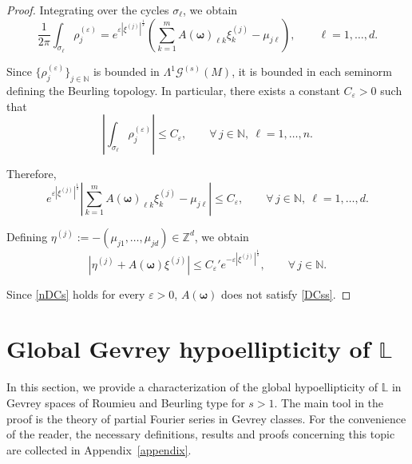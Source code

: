 \documentclass[11pt,reqno]{amsart}
\numberwithin{equation}{section}
\begin{document}
\begin{proof}
	Integrating over the cycles $\sigma_\ell$,
	we obtain
	\[
	\frac{1}{2\pi} \int_{\sigma_\ell} \rho_j^{(\varepsilon)} =  	e^{\varepsilon |\xi^{(j)}|^{\frac{1}{s}}}\left( \sum_{k=1}^{m} A(\boldsymbol{\omega})_{\ell k}\xi^{(j)}_k
	- \mu_{j\ell} 	\right), 	\qquad 	\ell=1,\dots,d.
	\]
	
	Since $\{\rho_j^{(\varepsilon)}\}_{j\in\mathbb{N}}$ is bounded in  $\mathsf{\Lambda}^1 \mathscr{G}^{(s)}(M)$, it is bounded in each seminorm defining the Beurling topology. In particular, there exists a constant 
	$C_\varepsilon>0$ such that
	\[
	\left| 	\int_{\sigma_\ell} 	\rho_j^{(\varepsilon)} 	\right|
	\le 	C_\varepsilon, 	\qquad 	\forall\, j\in\mathbb{N},\  \ell=1,\dots,n.
	\]
	
	Therefore,
	\[
	e^{\varepsilon|\xi^{(j)}|^{\frac{1}{s}}} \left| \sum_{k=1}^{m} 	A(\boldsymbol{\omega})_{\ell k}\xi^{(j)}_k - \mu_{j\ell} 	\right|
	\le C_\varepsilon, 	\qquad	\forall\,j\in\mathbb{N},\ \ell=1,\dots,d.
	\]
	
	Defining $\eta^{(j)} := -(\mu_{j1},\dots,\mu_{jd})\in\mathbb{Z}^d$, 
	we obtain
	\begin{equation}\label{nDCs}
	|\eta^{(j)} + A(\boldsymbol{\omega})\xi^{(j)}| \le C_\varepsilon' e^{-\varepsilon| \xi^{(j)}|^{\frac{1}{s}}},\qquad\forall\,j\in\mathbb{N}.
	\end{equation}
	
	Since \eqref{nDCs} holds for every $\varepsilon>0$, $A(\boldsymbol{\omega})$ does not satisfy \eqref{DCss}.
	\end{proof}



	\section{Global Gevrey hypoellipticity of $\mathbb{L}$}\label{sec-sHypoel}
	
	In this section, we provide a characterization of the global hypoellipticity of $\mathbb{L}$ in Gevrey spaces of Roumieu and Beurling type for $s>1$. 
	The main tool in the proof is the theory of partial Fourier series in Gevrey classes. 
	For the convenience of the reader, the necessary definitions, results and proofs concerning this topic are collected in Appendix~\ref{appendix}.
	
\end{document}
